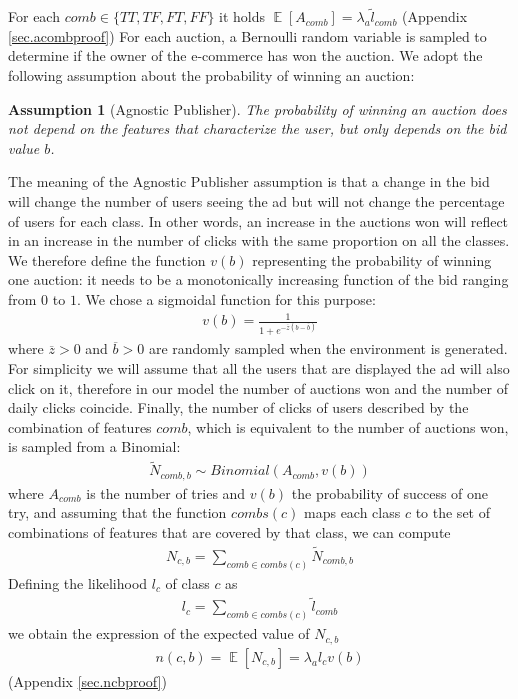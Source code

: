 \documentclass[11pt]{article} %
\DeclareMathOperator{\EX}{\mathbb{E}}
\newtheorem*{assumption}{Assumption}
\begin{document}
For each $comb \in \{TT,TF,FT,FF\}$ it holds $\EX[A_{comb}] = \lambda_a \tilde{l}_{comb}$ (Appendix \ref{sec.acombproof})
\newline
\newline
For each auction, a Bernoulli random variable is sampled to determine if the owner of the e-commerce has won the auction. We adopt the following assumption about the probability of winning an auction:
\begin{assumption}[Agnostic Publisher] The probability of winning an auction does not depend on the features that characterize the user, but only depends on the bid value $b$.
\end{assumption}
The meaning of the Agnostic Publisher assumption is that a change in the bid will change the number of users seeing the ad but will not change the percentage of users for each class. In other words, an increase in the auctions won will reflect in an increase in the number of clicks with the same proportion on all the classes.
\newline
\newline
We therefore define the function $v(b)$ representing the probability of winning one auction: it needs to be a monotonically increasing function of the bid ranging from $0$ to $1$. We chose a sigmoidal function for this purpose:
\begin{align*}
v(b)=\frac{1}{1+e^{-\overline z(b-\overline b)}}
\end{align*}
where $\overline z > 0$ and $\overline b > 0$ are randomly sampled when the environment is generated.
\newline
\newline
{\color{red}For simplicity we will assume that all the users that are displayed the ad will also click on it, therefore in our model the number of auctions won and the number of daily clicks coincide.}
\newline
\newline
Finally, the number of clicks of users described by the combination of features $comb$, which is equivalent to the number of auctions won, is sampled from a Binomial:
\begin{align*}
\tilde{N}_{comb,b} \sim Binomial(A_{comb}, v(b))
\end{align*}
where $A_{comb}$ is the number of tries and $v(b)$ the probability of success of one try, and assuming that the function $combs(c)$ maps each class $c$ to the set of combinations of features that are covered by that class, we can compute
\begin{align*}
N_{c,b} = \sum_{comb \in combs(c)}{\tilde{N}_{comb,b}}
\end{align*}
Defining the likelihood $l_c$ of class $c$ as 
\begin{align*}
l_c = \sum_{comb \in combs(c)}{\tilde{l}_{comb}}
\end{align*}
we obtain the expression of the expected value of $N_{c,b}$ 
\begin{align*}
n(c,b) = \EX[N_{c,b}] =\lambda_al_{c}v(b)
\end{align*}
 (Appendix \ref{sec.ncbproof})
\end{document}
